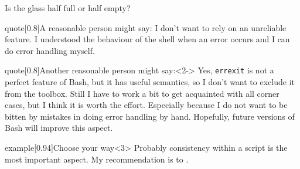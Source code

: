 \begin{frame}{Is the glass half full or half empty?}
    \vspace{-2mm}
    \begin{varblock}{quote}[0.8\textwidth]{A reasonable person might say:}
        I don't want to rely on an unreliable feature.
        I understood the behaviour of the shell when an error occurs and I can do error handling myself.
    \end{varblock}
    \begin{varblock}{quote}[0.8\textwidth]{Another reasonable person might say:}<2->
        Yes, \texttt{errexit} is not a perfect feature of Bash, but it has useful semantics, so I don't want to exclude it from the toolbox.
        Still I have to work a bit to get acquainted with all corner cases, but I think it is worth the effort.
        Especially because I do not want to be bitten by mistakes in doing error handling by hand.
        Hopefully, future versions of Bash will improve this aspect.
    \end{varblock}
    \begin{varblock}{example}[0.94\textwidth]{Choose your way}<3>
        Probably consistency within a script is the most important aspect.
        My recommendation is to .
    \end{varblock}
    \PrepareURLsymbol[PB]
\end{frame}
